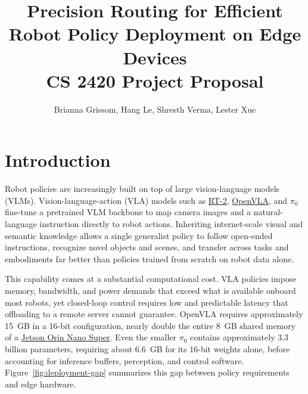 \documentclass[11pt]{article}
\title{Precision Routing for Efficient Robot Policy Deployment on Edge Devices\\
\large CS 2420 Project Proposal}
\author{Brianna Grissom, Hang Le, Shresth Verma, Lester Xue}
\begin{document}
\maketitle

\section{Introduction}

Robot policies are increasingly built on top of large vision-language
models (VLMs). Vision-language-action (VLA) models such as
\href{https://arxiv.org/abs/2307.15818}{RT-2},
\href{https://arxiv.org/abs/2406.09246}{OpenVLA}, and
\href{https://arxiv.org/abs/2410.24164}{$\pi_0$} fine-tune a pretrained
VLM backbone to map camera images and a natural-language instruction
directly to robot actions. Inheriting internet-scale visual and semantic
knowledge allows a single generalist policy to follow open-ended
instructions, recognize novel objects and scenes, and transfer across
tasks and embodiments far better than policies trained from scratch on
robot data alone.

This capability comes at a substantial computational cost. VLA policies
impose memory, bandwidth, and power demands that exceed what is
available onboard most robots, yet closed-loop control requires low and
predictable latency that offloading to a remote server cannot guarantee.
OpenVLA requires approximately 15~GB in a 16-bit configuration, nearly
double the entire 8~GB shared memory of a
\href{https://www.nvidia.com/en-us/autonomous-machines/embedded-systems/jetson-orin/}{Jetson Orin Nano Super}.
Even the smaller $\pi_0$ contains approximately 3.3 billion parameters,
requiring about 6.6~GB for its 16-bit weights alone, before accounting
for inference buffers, perception, and control software.
Figure~\ref{fig:deployment-gap} summarizes this gap between policy
requirements and edge hardware.
\end{document}

